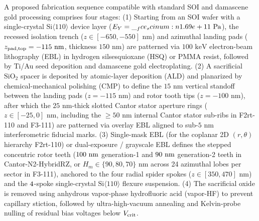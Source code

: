 \documentclass[pdflatex,sn-nature]{sn-jnl}
\DeclareRobustCommand{\scinum}[1]{\__fce_scinum:n{#1}}
\begin{document}
A proposed fabrication sequence compatible with standard SOI and damascene gold processing comprises four stages: (1) Starting from an SOI wafer with a single-crystal $\text{Si}\langle 110\rangle$ device layer ($E_Y = \scinum{\NatureRotCeightCompactNtwoLateralStabilityEYPa}\text{ Pa}$), the recessed isolation trench ($z \in [-650, -550]\text{ nm}$) and azimuthal landing pads ($z_{\rm pad,top} = -115\text{ nm}$, thickness $150\text{ nm}$) are patterned via $100\text{ keV}$ electron-beam lithography (EBL) in hydrogen silsesquioxane (HSQ) or PMMA resist, followed by Ti/Au seed deposition and damascene gold electroplating. (2) A sacrificial $\text{SiO}_2$ spacer is deposited by atomic-layer deposition (ALD) and planarized by chemical-mechanical polishing (CMP) to define the $15\text{ nm}$ vertical standoff between the landing pads ($z = -115\text{ nm}$) and rotor tooth tips ($z = -100\text{ nm}$), after which the $25\text{ nm}$-thick slotted Cantor stator aperture rings ($z \in [-25, 0]\text{ nm}$, including the $\ge 50\text{ nm}$ internal Cantor stator sub-ribs in F2rt-110 and F3-111) are patterned via overlay EBL aligned to sub-$5\text{ nm}$ interferometric fiducial marks. (3) Single-mask EBL (for the coplanar 2D $(r,\theta)$ hierarchy F2rt-110) or dual-exposure / grayscale EBL defines the stepped concentric rotor teeth ($100{}\text{ nm}$ generation-1 and $90{}\text{ nm}$ generation-2 teeth in Cantor-N2-HybridRZ, or $H_m \in \{90, 80, 70\}\text{ nm}$ across 24 azimuthal lobes per sector in F3-111), anchored to the four radial spider spokes ($z \in [350, 470]\text{ nm}$) and the $4{}$-spoke single-crystal $\text{Si}\langle 110\rangle$ flexure suspension. (4) The sacrificial oxide is removed using anhydrous vapor-phase hydrofluoric acid (vapor-HF) to prevent capillary stiction, followed by ultra-high-vacuum annealing and Kelvin-probe nulling of residual bias voltages below $V_{\rm crit}$.
\end{document}
